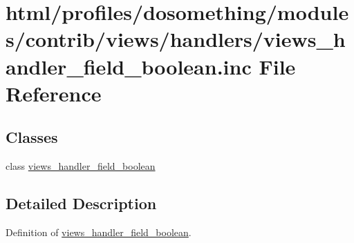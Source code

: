 \hypertarget{views__handler__field__boolean_8inc}{
\section{html/profiles/dosomething/modules/contrib/views/handlers/views\_\-handler\_\-field\_\-boolean.inc File Reference}
\label{views__handler__field__boolean_8inc}
}
\subsection*{Classes}
\begin{DoxyCompactItemize}
\item 
class \hyperlink{classviews__handler__field__boolean}{views\_\-handler\_\-field\_\-boolean}
\end{DoxyCompactItemize}


\subsection{Detailed Description}
Definition of \hyperlink{classviews__handler__field__boolean}{views\_\-handler\_\-field\_\-boolean}. 